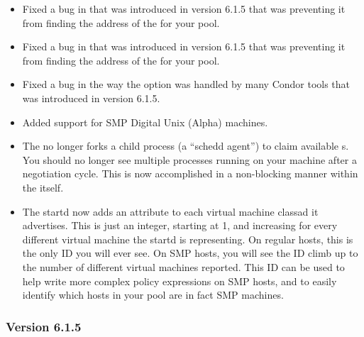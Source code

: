 \begin{itemize}

\item Fixed a bug in  that was introduced in version
6.1.5 that was preventing it from finding the address of the
 for your pool.

\item Fixed a bug in  that was introduced in version
6.1.5 that was preventing it from finding the address of the
 for your pool.

\item Fixed a bug in the way the  option was handled by
many Condor tools that was introduced in version 6.1.5. 

\item Added support for SMP Digital Unix (Alpha) machines.

\item The  no longer forks a child process (a ``schedd
agent'') to claim available s.  
You should no longer see multiple  processes running on
your machine after a negotiation cycle.
This is now accomplished in a non-blocking manner within the
 itself.

\item The startd now adds an  attribute to
each virtual machine classad it advertises.
This is just an integer, starting at 1, and increasing for every
different virtual machine the startd is representing.
On regular hosts, this is the only ID you will ever see.
On SMP hosts, you will see the ID climb up to the number of different
virtual machines reported.
This ID can be used to help write more complex policy expressions on
SMP hosts, and to easily identify which hosts in your pool are in fact
SMP machines.

\end{itemize}

\subsubsection{\label{sec:New-6-1-5}Version 6.1.5}

